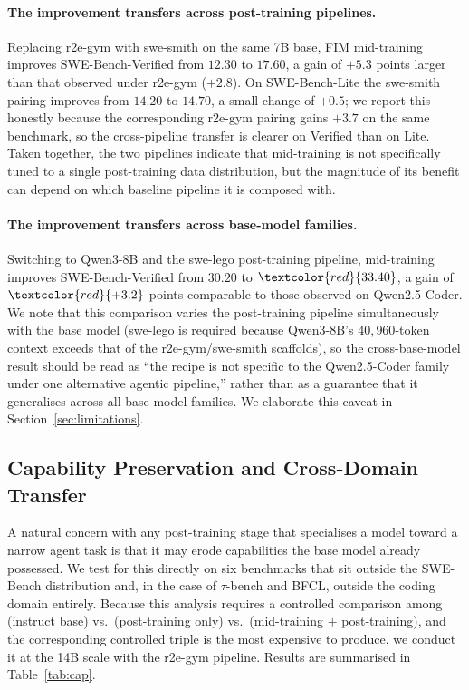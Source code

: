 \paragraph{The improvement transfers across post-training pipelines.}
Replacing r2e-gym with swe-smith on the same 7B base, FIM mid-training
improves SWE-Bench-Verified from $12.30$ to $17.60$, a gain of $+5.3$
points larger than that observed under r2e-gym ($+2.8$). On SWE-Bench-Lite
the swe-smith pairing improves from $14.20$ to $14.70$, a small change of
$+0.5$; we report this honestly because the corresponding r2e-gym pairing
gains $+3.7$ on the same benchmark, so the cross-pipeline transfer is
clearer on Verified than on Lite. Taken together, the two pipelines
indicate that mid-training is not specifically tuned to a single
post-training data distribution, but the magnitude of its benefit can
depend on which baseline pipeline it is composed with.

\paragraph{The improvement transfers across base-model families.}
Switching to Qwen3-8B and the swe-lego post-training pipeline,
mid-training improves SWE-Bench-Verified from $30.20$ to
$\textcolor{red}{33.40}$, a gain of $\textcolor{red}{+3.2}$ points
comparable to those observed on Qwen2.5-Coder. We note that this
comparison varies the post-training pipeline simultaneously with the base
model (swe-lego is required because Qwen3-8B's $40{,}960$-token context
exceeds that of the r2e-gym/swe-smith scaffolds), so the cross-base-model
result should be read as ``the recipe is not specific to the
Qwen2.5-Coder family under one alternative agentic pipeline,'' rather
than as a guarantee that it generalises across all base-model families.
We elaborate this caveat in Section~\ref{sec:limitations}.


\subsection{Capability Preservation and Cross-Domain Transfer}
\label{sec:exp:gen}

A natural concern with any post-training stage that specialises a model
toward a narrow agent task is that it may erode capabilities the base
model already possessed. We test for this directly on six benchmarks that
sit outside the SWE-Bench distribution and, in the case of $\tau$-bench
and BFCL, outside the coding domain entirely. Because this analysis
requires a controlled comparison among (instruct base) vs.\ (post-training
only) vs.\ (mid-training $+$ post-training), and the corresponding
controlled triple is the most expensive to produce, we conduct it at the
14B scale with the r2e-gym pipeline. Results are summarised in
Table~\ref{tab:cap}.

